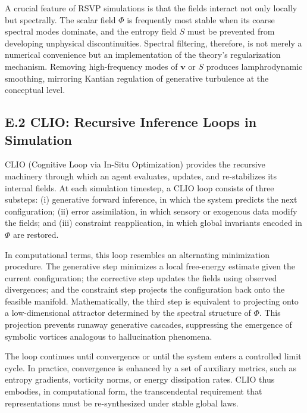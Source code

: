 \documentclass[12pt]{article}
\begin{document}
A crucial feature of RSVP simulations is that the fields interact not only 
locally but spectrally. The scalar field $\Phi$ is frequently most stable when 
its coarse spectral modes dominate, and the entropy field $S$ must be 
prevented from developing unphysical discontinuities.  
Spectral filtering, therefore, is not merely a numerical convenience but an 
implementation of the theory’s regularization mechanism. Removing high-frequency 
modes of $\mathbf{v}$ or $S$ produces lamphrodynamic smoothing, mirroring 
Kantian regulation of generative turbulence at the conceptual level.

\subsection*{E.2 CLIO: Recursive Inference Loops in Simulation}

CLIO (Cognitive Loop via In-Situ Optimization) provides the recursive machinery 
through which an agent evaluates, updates, and re-stabilizes its internal 
fields. At each simulation timestep, a CLIO loop consists of three substeps:  
(i) generative forward inference, in which the system predicts the next 
configuration; (ii) error assimilation, in which sensory or exogenous data 
modify the fields; and (iii) constraint reapplication, in which global 
invariants encoded in $\Phi$ are restored.

In computational terms, this loop resembles an alternating minimization 
procedure. The generative step minimizes a local free-energy estimate given the 
current configuration; the corrective step updates the fields using observed 
divergences; and the constraint step projects the configuration back onto the 
feasible manifold. Mathematically, the third step is equivalent to projecting 
onto a low-dimensional attractor determined by the spectral structure of $\Phi$.  
This projection prevents runaway generative cascades, suppressing the emergence 
of symbolic vortices analogous to hallucination phenomena.

The loop continues until convergence or until the system enters a controlled 
limit cycle.  
In practice, convergence is enhanced by a set of auxiliary metrics, such as 
entropy gradients, vorticity norms, or energy dissipation rates.  
CLIO thus embodies, in computational form, the transcendental requirement that 
representations must be re-synthesized under stable global laws.
\end{document}
